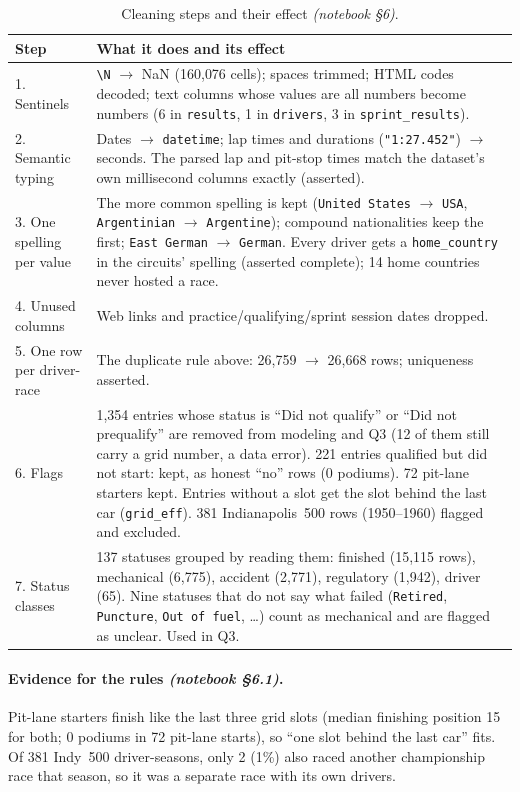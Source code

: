 \documentclass[11pt,a4paper]{article}
\newcommand{\code}[1]{\texttt{#1}}
\newcommand{\nb}[1]{\textit{(notebook \S#1)}}
\begin{document}
\begin{table}[H]
\centering\small
\caption{Cleaning steps and their effect \nb{6}.}
\label{tab:cleaning}
\begin{tabularx}{\linewidth}{lX}
\toprule
Step & What it does and its effect \\
\midrule
1. Sentinels & \verb|\N| $\rightarrow$ NaN (160{,}076 cells); spaces trimmed; HTML codes decoded; text columns whose values are all numbers become numbers (6 in \code{results}, 1 in \code{drivers}, 3 in \code{sprint\_results}). \\
2. Semantic typing & Dates $\rightarrow$ \code{datetime}; lap times and durations (\code{"1:27.452"}) $\rightarrow$ seconds. The parsed lap and pit-stop times match the dataset's own millisecond columns exactly (asserted). \\
3. One spelling per value & The more common spelling is kept (\code{United States} $\rightarrow$ \code{USA}, \code{Argentinian} $\rightarrow$ \code{Argentine}); compound nationalities keep the first; \code{East German} $\rightarrow$ \code{German}. Every driver gets a \code{home\_country} in the circuits' spelling (asserted complete); 14 home countries never hosted a race. \\
4. Unused columns & Web links and practice/qualifying/sprint session dates dropped. \\
5. One row per driver-race & The duplicate rule above: 26{,}759 $\rightarrow$ 26{,}668 rows; uniqueness asserted. \\
6. Flags & 1{,}354 entries whose status is ``Did not qualify'' or ``Did not prequalify'' are removed from modeling and Q3 (12 of them still carry a grid number, a data error). 221 entries qualified but did not start: kept, as honest ``no'' rows (0 podiums). 72 pit-lane starters kept. Entries without a slot get the slot behind the last car (\code{grid\_eff}). 381 Indianapolis~500 rows (1950--1960) flagged and excluded. \\
7. Status classes & 137 statuses grouped by reading them: finished (15{,}115 rows), mechanical (6{,}775), accident (2{,}771), regulatory (1{,}942), driver (65). Nine statuses that do not say what failed (\code{Retired}, \code{Puncture}, \code{Out of fuel}, \dots) count as mechanical and are flagged as unclear. Used in Q3. \\
\bottomrule
\end{tabularx}
\end{table}

\paragraph{Evidence for the rules \nb{6.1}.} Pit-lane starters finish like the last three grid slots (median finishing position 15 for both; 0 podiums in 72 pit-lane starts), so ``one slot behind the last car'' fits. Of 381 Indy~500 driver-seasons, only 2 (1\%) also raced another championship race that season, so it was a separate race with its own drivers.
\end{document}
